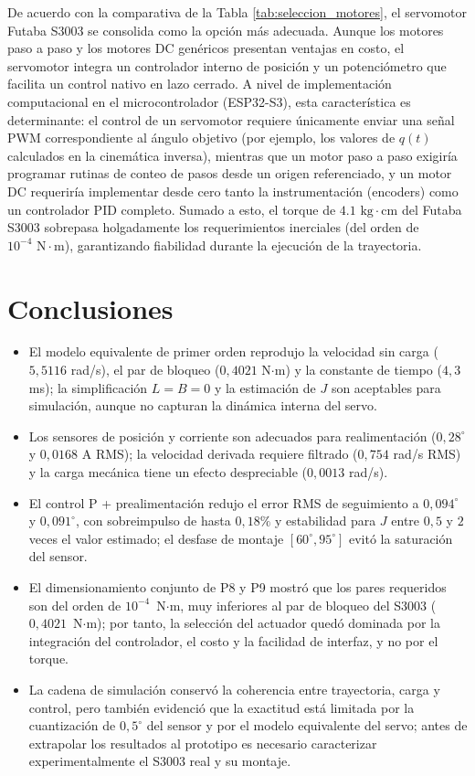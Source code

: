 \documentclass[10pt, letterpaper]{article}
\begin{document}
De acuerdo con la comparativa de la Tabla \ref{tab:seleccion_motores}, el servomotor Futaba S3003 se consolida como la opción más adecuada. Aunque los motores paso a paso y los motores DC genéricos presentan ventajas en costo, el servomotor integra un controlador interno de posición y un potenciómetro que facilita un control nativo en lazo cerrado. A nivel de implementación computacional en el microcontrolador (ESP32-S3), esta característica es determinante: el control de un servomotor requiere únicamente enviar una señal PWM correspondiente al ángulo objetivo (por ejemplo, los valores de $q(t)$ calculados en la cinemática inversa), mientras que un motor paso a paso exigiría programar rutinas de conteo de pasos desde un origen referenciado, y un motor DC requeriría implementar desde cero tanto la instrumentación (encoders) como un controlador PID completo. Sumado a esto, el torque de $4.1\text{ kg}\cdot\text{cm}$ del Futaba S3003 sobrepasa holgadamente los requerimientos inerciales (del orden de $10^{-4}\text{ N}\cdot\text{m}$), garantizando fiabilidad durante la ejecución de la trayectoria.



\section{Conclusiones}
\begin{itemize}
    \item El modelo equivalente de primer orden reprodujo la velocidad sin carga
    ($5{,}5116$ rad/s), el par de bloqueo ($0{,}4021$ N$\cdot$m) y la constante
    de tiempo ($4{,}3$ ms); la simplificación $L=B=0$ y la estimación de $J$ son
    aceptables para simulación, aunque no capturan la dinámica interna del servo.
    \item Los sensores de posición y corriente son adecuados para realimentación
    ($0{,}28^\circ$ y $0{,}0168$ A RMS); la velocidad derivada requiere filtrado
    ($0{,}754$ rad/s RMS) y la carga mecánica tiene un efecto despreciable
    ($0{,}0013$ rad/s).
    \item El control P + prealimentación redujo el error RMS de seguimiento a
    $0{,}094^\circ$ y $0{,}091^\circ$, con sobreimpulso de hasta $0{,}18\%$ y
    estabilidad para $J$ entre $0{,}5$ y $2$ veces el valor estimado; el desfase
    de montaje $[60^\circ,95^\circ]$ evitó la saturación del sensor.
    \item El dimensionamiento conjunto de P8 y P9 mostró que los pares requeridos
    son del orden de $10^{-4}$~N$\cdot$m, muy inferiores al par de bloqueo del
    S3003 ($0{,}4021$~N$\cdot$m); por tanto, la selección del actuador quedó
    dominada por la integración del controlador, el costo y la facilidad de
    interfaz, y no por el torque.
    \item La cadena de simulación conservó la coherencia entre
    trayectoria, carga y control, pero también evidenció que la exactitud está
    limitada por la cuantización de $0{,}5^\circ$ del sensor y por el modelo
    equivalente del servo; antes de extrapolar los resultados al prototipo es
    necesario caracterizar experimentalmente el S3003 real y su montaje.
\end{itemize}

\end{document}
